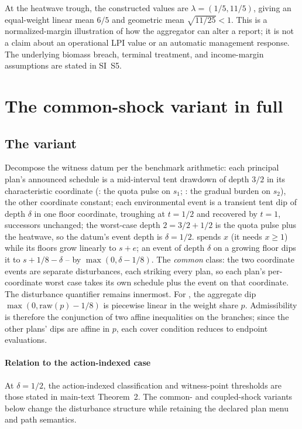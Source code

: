 At the heatwave trough, the constructed values are $\lambda=(1/5,11/5)$, giving an equal-weight linear mean $6/5$ and geometric mean $\sqrt{11/25}<1$. This is a normalized-margin illustration of how the aggregator can alter a report; it is not a claim about an operational LPI value or an automatic management response. The underlying biomass breach, terminal treatment, and income-margin assumptions are stated in SI~S5.

\section{The common-shock variant in full}\label{si:commonshock}

\subsection{The variant}

Decompose the witness datum per the benchmark arithmetic: each principal plan's announced schedule is a mid-interval tent drawdown of depth $3/2$ in its characteristic coordinate (: the quota pulse on $s_1$; : the gradual burden on $s_2$), the other coordinate constant; each environmental event is a transient tent dip of depth $\delta$ in one floor coordinate, troughing at $t=1/2$ and recovered by $t=1$, successors unchanged; the worst-case depth $2=3/2+1/2$ is the quota pulse plus the heatwave, so the datum's event depth is $\delta=1/2$.  spends $x$ (it needs $x\ge1$) while its floors grow linearly to $s+e$; an event of depth $\delta$ on a growing floor dips it to $s+1/8-\delta$ -- by $\max(0,\delta-1/8)$. The \emph{common} class: the two coordinate events are separate disturbances, each striking every plan, so each plan's per-coordinate worst case takes its own schedule plus the event on that coordinate. The disturbance quantifier remains innermost. For , the aggregate dip $\max(0,\mathrm{raw}(p)-1/8)$ is piecewise linear in the weight share $p$. Admissibility is therefore the conjunction of two affine inequalities on the branches; since the other plans' dips are affine in $p$, each cover condition reduces to endpoint evaluations.

\paragraph{Relation to the action-indexed case} At $\delta=1/2$, the action-indexed classification and witness-point thresholds are those stated in main-text Theorem~2. The common- and coupled-shock variants below change the disturbance structure while retaining the declared plan menu and path semantics.

